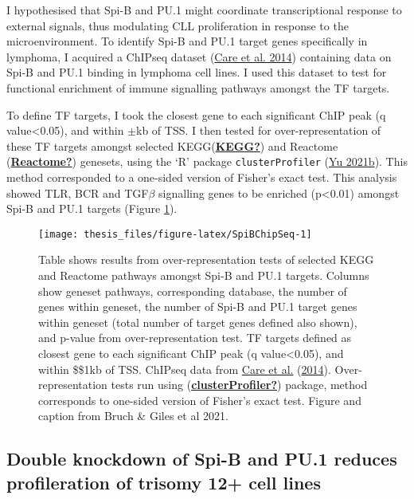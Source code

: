 \documentclass[11pt, a4paper, twosided]{book}
\begin{document}
I hypothesised that Spi-B and PU.1 might coordinate transcriptional response to external signals, thus modulating CLL proliferation in response to the microenvironment. To identify Spi-B and PU.1 target genes specifically in lymphoma, I acquired a ChIPseq dataset (\protect\hyperlink{ref-Care2014}{Care et al. 2014}) containing data on Spi-B and PU.1 binding in lymphoma cell lines. I used this dataset to test for functional enrichment of immune signalling pathways amongst the TF targets.

To define TF targets, I took the closest gene to each significant ChIP peak (q value\textless0.05), and within \(\pm\)kb of TSS. I then tested for over-representation of these TF targets amongst selected KEGG(\protect\hyperlink{ref-KEGG}{\textbf{KEGG?}}) and Reactome (\protect\hyperlink{ref-Reactome}{\textbf{Reactome?}}) genesets, using the `R' package \texttt{clusterProfiler} (\protect\hyperlink{ref-R-clusterProfiler}{Yu 2021b}). This method corresponded to a one-sided version of Fisher's exact test. This analysis showed TLR, BCR and TGF\(\beta\) signalling genes to be enriched (p\textless0.01) amongst Spi-B and PU.1 targets (Figure \ref{fig:SpiBChipSeq}).


\begin{figure}

{\centering \texttt{[image: thesis\_files/figure-latex/SpiBChipSeq-1]} 

}

\caption{Table shows results from over-representation tests of selected KEGG and Reactome pathways amongst Spi-B and PU.1 targets. Columns show geneset pathways, corresponding database, the number of genes within geneset, the number of Spi-B and PU.1 target genes within geneset (total number of target genes defined also shown), and p-value from over-representation test. TF targets defined as closest gene to each significant ChIP peak (q value\textless0.05), and within \$\pm\$1kb of TSS. ChIPseq data from \protect\hyperlink{ref-Care2014}{Care et al.} (\protect\hyperlink{ref-Care2014}{2014}). Over-representation tests run using (\protect\hyperlink{ref-clusterProfiler}{\textbf{clusterProfiler?}}) package, method corresponds to one-sided version of Fisher's exact test. Figure and caption from Bruch \& Giles et al 2021.}\label{fig:SpiBChipSeq}
\end{figure}
\hypertarget{double-knockdown-of-spi-b-and-pu.1-reduces-profileration-of-trisomy-12-cell-lines}{%
\subsection{Double knockdown of Spi-B and PU.1 reduces profileration of trisomy 12+ cell lines}\label{double-knockdown-of-spi-b-and-pu.1-reduces-profileration-of-trisomy-12-cell-lines}}
\end{document}
